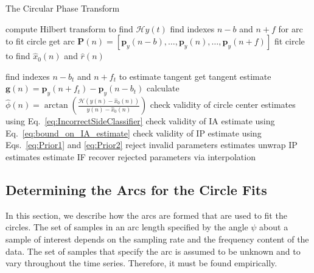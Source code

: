 \documentclass[a4paper]{IEEEtran}
\begin{document}
\begin{algorithm}
\caption{The Circular Phase Transform}\label{CPTAlgorithm}
\begin{algorithmic}[1]
\State compute Hilbert transform to find $\mathcal{H}y(t)$
	\State find indexes $n-b$ and $n+f$ for arc to fit circle
	\State get arc $\mathbf{P}(n) = [\mathbf{p}_y(n-b),\hdots, \mathbf{p}_y(n),\hdots,\mathbf{p}_y(n+f)]$
	\State fit circle to find $\hat{x}_0(n)$ and $\hat{r}(n)$

	\State find indexes $n-b_t$ and $n+f_t$ to estimate tangent 
	\State get tangent estimate $\mathbf{g}(n)= \mathbf{p}_y(n + f_t) - \mathbf{p}_y(n - b_t)$
\EndFor
\State calculate $\hat\phi(n) = \arctan\left(\frac{\mathcal{H}(y(n) - \hat{x}_0(n))}{y(n) - \hat{x}_0(n)}\right)$
\State check validity of circle center estimates using Eq.~\ref{eq:IncorrectSideClassifier}
\State check validity of IA estimate using Eq.~\ref{eq:bound_on_IA_estimate}
\State check validity of IP estimate using Eqs.~\ref{eq:Prior1} and \ref{eq:Prior2}
\State reject invalid parameters estimates
\State unwrap IP estimates
\State estimate IF
\State recover rejected parameters via interpolation
\end{algorithmic}
\end{algorithm}

\subsection{Determining the Arcs for the Circle Fits}\label{sect:FindingArc}
In this section, we describe how the arcs are formed that are used to fit the circles. The set of samples in an arc length specified by the angle $\psi$ about a sample of interest depends on the sampling rate and the frequency content of the data. The set of samples that specify the arc is assumed to be unknown and to vary throughout the time series. Therefore, it must be found empirically.
\end{document}
